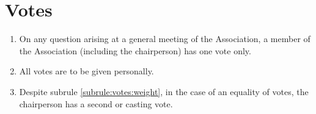 \section{Votes}
\label{rule:votes}

\begin{enumerate}
	\item \label{subrule:votes:weight} On any question arising at a general meeting of the Association, a member of the Association (including the chairperson) has one vote only.
	\item All votes are to be given personally.
	\item Despite subrule \ref{subrule:votes:weight}, in the case of an equality of votes, the chairperson has a second or casting vote.
\end{enumerate}